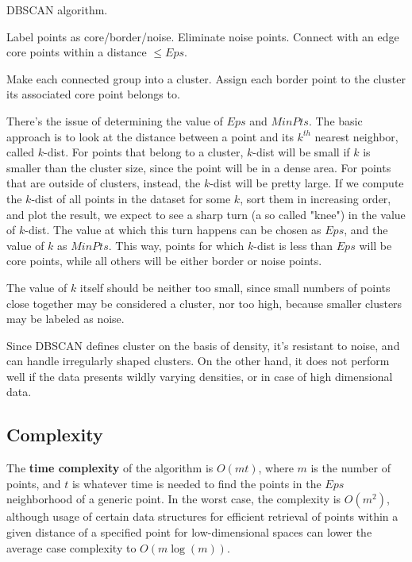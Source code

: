 \begin{algorithm}
\caption{DBSCAN algorithm.}
\begin{algorithmic}[1]
    \State Label points as core/border/noise.
    \State Eliminate noise points.
    \State Connect with an edge core points within a distance $\leq Eps$.

    \State Make each connected group into a cluster.
    \State Assign each border point to the cluster its associated core point belongs to.
\end{algorithmic}
\end{algorithm}

There's the issue of determining the value of $Eps$ and $MinPts$. The basic approach is to look at the distance between a point and its $k^{th}$ nearest neighbor, called $k$-dist. For points that belong to a cluster, $k$-dist will be small if $k$ is smaller than the cluster size, since the point will be in a dense area. For points that are outside of clusters, instead, the $k$-dist will be pretty large. If we compute the $k$-dist of all points in the dataset for some $k$, sort them in increasing order, and plot the result, we expect to see a sharp turn (a so called "knee") in the value of $k$-dist. The value at which this turn happens can be chosen as $Eps$, and the value of $k$ as $MinPts$. This way, points for which $k$-dist is less than $Eps$ will be core points, while all others will be either border or noise points.

The value of $k$ itself should be neither too small, since small numbers of points close together may be considered a cluster, nor too high, because smaller clusters may be labeled as noise.

Since DBSCAN defines cluster on the basis of density, it's resistant to noise, and can handle irregularly shaped clusters. On the other hand, it does not perform well if the data presents wildly varying densities, or in case of high dimensional data.

\subsection{Complexity}

The \textbf{time complexity} of the algorithm is $O(m t)$, where $m$ is the number of points, and $t$ is whatever time is needed to find the points in the $Eps$ neighborhood of a generic point. In the worst case, the complexity is $O(m^2)$, although usage of certain data structures for efficient retrieval of points within a given distance of a specified point for low-dimensional spaces can lower the average case complexity to $O(m \log(m))$.

